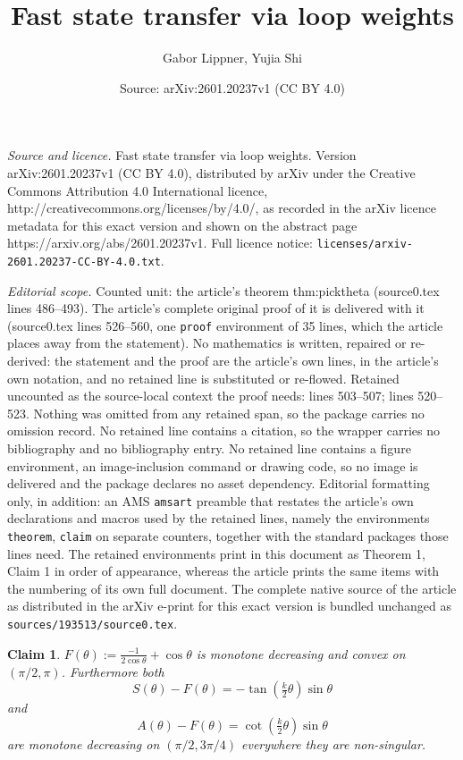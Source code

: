\documentclass[10pt,a4paper]{amsart}
\title{Fast state transfer via loop weights}
\author{Gabor Lippner, Yujia Shi}
\date{Source: arXiv:2601.20237v1 (CC BY 4.0)}
\newtheorem{claim}{Claim}
\begin{document}
\maketitle

\noindent\emph{Source and licence.} Fast state transfer via loop weights. Version arXiv:2601.20237v1 (CC BY 4.0), distributed by arXiv under the Creative Commons Attribution 4.0 International licence, http://creativecommons.org/licenses/by/4.0/, as recorded in the arXiv licence metadata for this exact version and shown on the abstract page https://arxiv.org/abs/2601.20237v1. Full licence notice: \texttt{licenses/arxiv-2601.20237-CC-BY-4.0.txt}.\par\smallskip

\noindent\textit{Editorial scope.} Counted unit: the article's theorem thm:picktheta (source0.tex lines 486--493). The article's complete original proof of it is delivered with it (source0.tex lines 526--560, one \texttt{proof} environment of 35 lines, which the article places away from the statement). No mathematics is written, repaired or re-derived: the statement and the proof are the article's own lines, in the article's own notation, and no retained line is substituted or re-flowed.  Retained uncounted as the source-local context the proof needs: lines 503--507; lines 520--523.  Nothing was omitted from any retained span, so the package carries no omission record.  No retained line contains a citation, so the wrapper carries no bibliography and no bibliography entry.  No retained line contains a figure environment, an image-inclusion command or drawing code, so no image is delivered and the package declares no asset dependency.  Editorial formatting only, in addition: an AMS \texttt{amsart} preamble that restates the article's own declarations and macros used by the retained lines, namely the environments \texttt{theorem}, \texttt{claim} on separate counters, together with the standard packages those lines need.  The retained environments print in this document as Theorem 1, Claim 1 in order of appearance, whereas the article prints the same items with the numbering of its own full document.  The complete native source of the article as distributed in the arXiv e-print for this exact version is bundled unchanged as \texttt{sources/193513/source0.tex}.
\begin{claim}\label{cl:monotone}
    $F(\theta):= \tfrac{-1}{2\cos \theta} + \cos \theta$ is monotone decreasing and convex on $(\pi/2,\pi)$. Furthermore both 
    \[S(\theta)-F(\theta) = -\tan\left(\tfrac{k}{2} \theta\right) \sin \theta\] and 
    \[A(\theta) - F(\theta)= \cot\left(\tfrac{k}{2} \theta\right) \sin \theta\] are monotone decreasing on $(\pi/2,3\pi/4)$ everywhere they are non-singular.
\end{claim}
\end{document}

